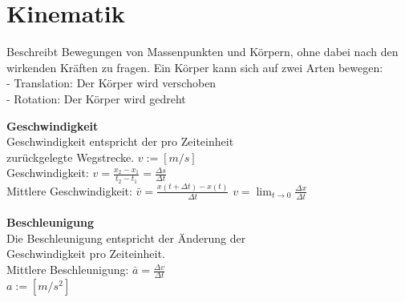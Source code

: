 \newpage
\section{Kinematik}

Beschreibt Bewegungen von Massenpunkten und 
Körpern, ohne dabei nach den wirkenden Kräften zu 
fragen.
Ein Körper kann sich auf zwei Arten bewegen: \\
- Translation: Der Körper wird verschoben \\
-  Rotation: Der Körper wird gedreht

\begin{multicols}{2}
\textbf{Geschwindigkeit} \\
Geschwindigkeit entspricht der pro Zeiteinheit \\
zurückgelegte Wegstrecke.  $v:= [m/s]$ \\
Geschwindigkeit: $v = \frac{x_{2} - x_{1}}{t_{2} - t_{1}} = \frac{\Delta s}{\Delta t}$  \\
Mittlere Geschwindigkeit: $ \bar{v} = \frac{x(t + \Delta t) - x(t)}{\Delta t}$  $v = \lim_{t \rightarrow 0} \frac{\Delta x}{\Delta t}$ \\
\columnbreak
\\
\textbf{Beschleunigung} \\
Die Beschleunigung entspricht der Änderung der \\
Geschwindigkeit pro Zeiteinheit. \\
Mittlere Beschleunigung: $\bar{a} = \frac{\Delta v}{ \Delta t} $   \\
$a:= [m/s^2]$ \\
\end{multicols}

